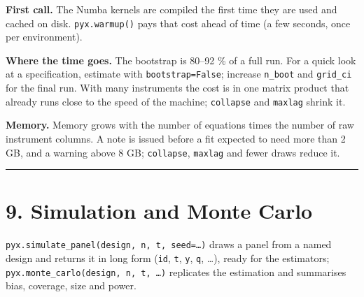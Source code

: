 \documentclass[
  10.5pt,
  a4paper,
]{article}
\begin{document}
\textbf{First call.} The Numba kernels are compiled the first time they
are used and cached on disk. \texttt{pyx.warmup()} pays that cost ahead
of time (a few seconds, once per environment).

\textbf{Where the time goes.} The bootstrap is 80--92 \% of a full run.
For a quick look at a specification, estimate with
\texttt{bootstrap=False}; increase \texttt{n\_boot} and
\texttt{grid\_ci} for the final run. With many instruments the cost is
in one matrix product that already runs close to the speed of the
machine; \texttt{collapse} and \texttt{maxlag} shrink it.

\textbf{Memory.} Memory grows with the number of equations times the
number of raw instrument columns. A note is issued before a fit expected
to need more than 2 GB, and a warning above 8 GB; \texttt{collapse},
\texttt{maxlag} and fewer draws reduce it.

\begin{center}\rule{0.5\linewidth}{0.5pt}\end{center}

\section{9. Simulation and Monte
Carlo}\label{simulation-and-monte-carlo}

\texttt{pyx.simulate\_panel(design,\ n,\ t,\ seed=…)} draws a panel from
a named design and returns it in long form (\texttt{id}, \texttt{t},
\texttt{y}, \texttt{q}, \ldots), ready for the estimators;
\texttt{pyx.monte\_carlo(design,\ n,\ t,\ …)} replicates the estimation
and summarises bias, coverage, size and power.
\end{document}
